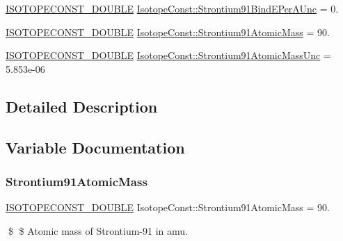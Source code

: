 \begin{DoxyCompactItemize}
\mbox{\hyperlink{group___isotope_const-_macros_ga8f45a7272ce02c0b4c65c44636ed719a}{I\+S\+O\+T\+O\+P\+E\+C\+O\+N\+S\+T\+\_\+\+D\+O\+U\+B\+LE}} \mbox{\hyperlink{group___isotope_const-_strontium-_sr91_ga4c575fc9e2a01f5e1e53070f9f37f2e2}{Isotope\+Const\+::\+Strontium91\+Bind\+E\+Per\+A\+Unc}} = 0.
\item 
\mbox{\hyperlink{group___isotope_const-_macros_ga8f45a7272ce02c0b4c65c44636ed719a}{I\+S\+O\+T\+O\+P\+E\+C\+O\+N\+S\+T\+\_\+\+D\+O\+U\+B\+LE}} \mbox{\hyperlink{group___isotope_const-_strontium-_sr91_gadca1e1e561fab57e42da7ca3512747e4}{Isotope\+Const\+::\+Strontium91\+Atomic\+Mass}} = 90.
\item 
\mbox{\hyperlink{group___isotope_const-_macros_ga8f45a7272ce02c0b4c65c44636ed719a}{I\+S\+O\+T\+O\+P\+E\+C\+O\+N\+S\+T\+\_\+\+D\+O\+U\+B\+LE}} \mbox{\hyperlink{group___isotope_const-_strontium-_sr91_ga78d88f40db0b0b9015e55972061ffaa7}{Isotope\+Const\+::\+Strontium91\+Atomic\+Mass\+Unc}} = 5.\+853e-\/06
\end{DoxyCompactItemize}


\subsection{Detailed Description}


\subsection{Variable Documentation}
\mbox{\label{group___isotope_const-_strontium-_sr91_gadca1e1e561fab57e42da7ca3512747e4}} 
\subsubsection{\texorpdfstring{Strontium91\+Atomic\+Mass}{Strontium91AtomicMass}}
{\footnotesize\ttfamily \mbox{\hyperlink{group___isotope_const-_macros_ga8f45a7272ce02c0b4c65c44636ed719a}{I\+S\+O\+T\+O\+P\+E\+C\+O\+N\+S\+T\+\_\+\+D\+O\+U\+B\+LE}} Isotope\+Const\+::\+Strontium91\+Atomic\+Mass = 90.}

\$ \$ Atomic mass of Strontium-\/91 in amu. \mbox{\label{group___isotope_const-_strontium-_sr91_ga78d88f40db0b0b9015e55972061ffaa7}} 
